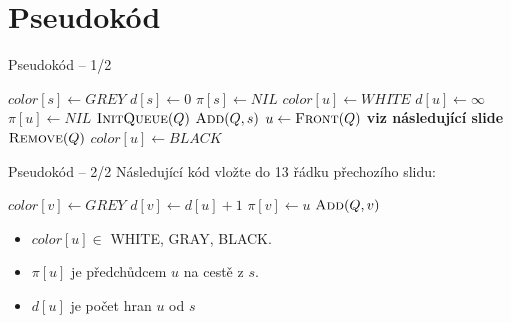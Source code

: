 \documentclass[10pt, czech]{beamer}
\begin{document}
\section{Pseudokód}
\begin{frame}{Pseudokód -- 1/2}
    \begin{algorithmic}[1]
        \State $color[s] \gets GREY$
        \State $d[s] \gets 0$
        \State $\pi[s] \gets NIL$
            \State $color[u] \gets WHITE$
            \State $d[u] \gets \infty$
            \State $\pi[u] \gets NIL$
        \EndFor
        \State $\textsc{InitQueue}(Q)$
        \State $\textsc{Add}(Q, s)$
            \State $u \gets \textsc{Front}(Q)$
            \State \textbf{viz následující slide}
            \State $\textsc{Remove}(Q)$
            \State $color[u] \gets BLACK$
        \EndWhile
    \end{algorithmic}
\end{frame}

\begin{frame}{Pseudokód -- 2/2}
    Následující kód vložte do 13 řádku přechozího slidu:
    \bigskip
    \begin{algorithmic}[1]
                \State $color[v] \gets GREY$
                \State $d[v] \gets d[u]+1$
                \State $\pi[v] \gets u$
                \State $\textsc{Add}(Q, v)$
            \EndIf
        \EndFor
    \end{algorithmic}
    \medskip
    \begin{itemize}
        \item $color[u] \in$ {WHITE, GRAY, BLACK}.
        \item $\pi[u]$ je předchůdcem $u$ na cestě z $s$.
        \item $d[u]$ je počet hran $u$ od $s$
    \end{itemize}
\end{frame}

\end{document}
